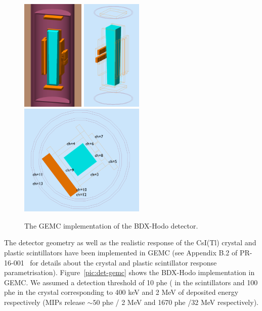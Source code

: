 \begin{figure}[h!] 
\center
\includegraphics[width=2.99cm]{figs/gemc-3d.pdf}  
\includegraphics[width=2.9cm]{figs/gemc-3d1.pdf}  
\includegraphics[width=6.0cm]{figs/gemc-3d2.pdf}  
\caption{The GEMC  implementation of the BDX-Hodo detector.}
\label{fig:det-gemc}
\end{figure}


The  detector geometry as well as the realistic response of the CsI(Tl) crystal and plastic scintillators have been implemented in GEMC (see  Appendix B.2 of PR-16-001~\cite{bdx-proposal} for details about the crystal and plastic scintillator response parametrisation). 
Figure~\ref{pic:det-gemc} shows the BDX-Hodo implementation in GEMC. 
We assumed a detection threshold of 10 phe ( in the scintillators and 100 phe in the crystal corresponding to 400 keV and 2 MeV of deposited energy respectively (MIPs release $\sim50$ phe / 2 MeV and 1670 phe /32 MeV  respectively). 



